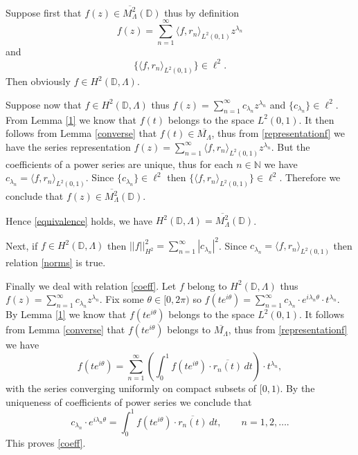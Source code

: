 \documentclass[11pt, a4paper]{article}
\begin{document}
Suppose first that $f(z)\in \overline{M^2_{\Lambda}}(\mathbb{D})$ thus by definition
\[
f(z)=\sum_{n=1}^{\infty} \langle f, r_n\rangle_{L^2 (0,1)} z^{\lambda_n}
\]
and
\[
\{\langle f, r_n\rangle_{L^2 (0,1)}\} \in\ell^2.
\]
Then obviously $f\in H^2 (\mathbb{D}, \Lambda)$.

Suppose now that $f\in H^2 (\mathbb{D}, \Lambda)$ thus $f(z)=\sum_{n=1}^{\infty} c_{\lambda_n} z^{\lambda_n}$ and $\{c_{\lambda_n}\}\in\ell^2$.
From Lemma \ref{1} we know that $f(t)$ belongs to the space $L^2 (0,1)$.
It then follows from Lemma \ref{converse} that $f(t)\in\overline{M_{\Lambda}}$, thus from \eqref{representationf}
we have the series representation $f(z)=\sum_{n=1}^{\infty}\langle f, r_n\rangle_{L^2 (0,1)} z^{\lambda_n}$.
But the coefficients of a power series are unique,
thus for each $n\in\mathbb{N}$ we have $c_{\lambda_n}=\langle f, r_n\rangle_{L^2 (0,1)}$. Since $\{c_{\lambda_n}\}\in\ell^2$ then
$\{\langle f, r_n\rangle_{L^2 (0,1)}\}\in\ell^2$. Therefore we conclude that $f(z)\in \overline{M^2_{\Lambda}}(\mathbb{D})$.

Hence \eqref{equivalence} holds, we have $H^2(\mathbb{D}, \Lambda)=\overline{M^2_{\Lambda}}(\mathbb{D})$.\\




\smallskip




Next, if $f\in H^2 (\mathbb{D}, \Lambda)$ then $||f||_{H^2}^2=\sum_{n=1}^{\infty}|c_{\lambda_n}|^2$. Since
$c_{\lambda_n}=\langle f, r_n\rangle_{L^2 (0,1)}$ then relation \eqref{norms} is true. \\



\smallskip



Finally we deal with relation \eqref{coeff}. Let $f$ belong to $H^2 (\mathbb{D}, \Lambda)$
thus $f(z)=\sum_{n=1}^{\infty} c_{\lambda_n} z^{\lambda_n}$.
Fix some $\theta\in [0,2\pi)$ so $f(te^{i\theta})=\sum_{n=1}^{\infty} c_{\lambda_n}\cdot e^{i\lambda_n\theta}\cdot t^{\lambda_n}$.
By Lemma \ref{1} we know that $f(te^{i\theta})$ belongs to the space $L^2 (0,1)$. It follows from Lemma \ref{converse}
that $f(te^{i\theta})$ belongs to $\overline{M_{\Lambda}}$, thus from \eqref{representationf} we have
\[
f(te^{i\theta})=\sum_{n=1}^{\infty}\left(\int_{0}^{1} f(te^{i\theta})\cdot \overline{r_n(t)}\, dt\right)\cdot t^{\lambda_n},
\]
with the series converging uniformly on compact subsets of $[0,1)$. By the uniqueness of coefficients of power series we conclude that
\[
c_{\lambda_n}\cdot e^{i\lambda_n\theta}=\int_{0}^{1} f(te^{i\theta})\cdot \overline{r_n(t)}\, dt,\qquad n=1,2,\dots.
\]
This proves \eqref{coeff}.
\end{document}
